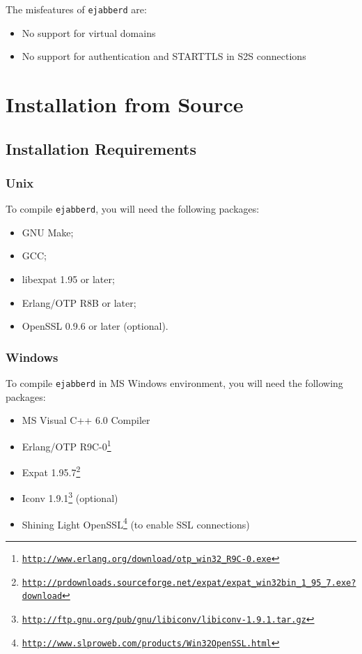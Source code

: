 \documentclass[a4paper,10pt]{article}
\newcommand{\ejabberd}{\texttt{ejabberd}}
\gdef\footahref#1#2{#2\footnote{\href{#1}{\texttt{#1}}}}
\begin{document}
The misfeatures of \ejabberd{} are:
\begin{itemize}
\item No support for virtual domains
\item No support for authentication and STARTTLS in S2S connections
\end{itemize}


\section{Installation from Source}
\label{sec:installation}

\subsection{Installation Requirements}
\label{sec:installreq}

\subsubsection{Unix}
\label{sec:installrequnix}

To compile \ejabberd{}, you will need the following packages:
\begin{itemize}
\item GNU Make;
\item GCC;
\item libexpat 1.95 or later;
\item Erlang/OTP R8B or later;
\item OpenSSL 0.9.6 or later (optional).
\end{itemize}

\subsubsection{Windows}
\label{sec:installreqwin}

To compile \ejabberd{} in MS Windows environment, you will need the following
packages:
\begin{itemize}
\item MS Visual C++ 6.0 Compiler
\item \footahref{http://www.erlang.org/download/otp\_win32\_R9C-0.exe}{Erlang/OTP R9C-0}
\item \footahref{http://prdownloads.sourceforge.net/expat/expat\_win32bin\_1\_95\_7.exe?download}{Expat 1.95.7}
\item
\footahref{http://ftp.gnu.org/pub/gnu/libiconv/libiconv-1.9.1.tar.gz}{Iconv 1.9.1}
(optional)
\item \footahref{http://www.slproweb.com/products/Win32OpenSSL.html}{Shining Light OpenSSL}
(to enable SSL connections)
\end{itemize}
\end{document}
